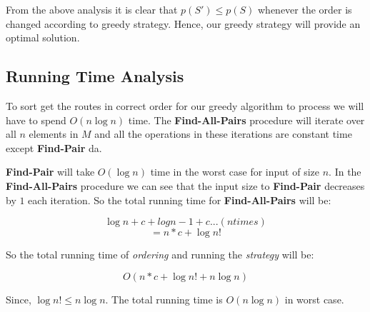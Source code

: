 \documentclass[8pt]{article}
\begin{document}
From the above analysis it is clear that $p(S') \leq p(S)$ whenever the order is changed according to greedy strategy. Hence, our greedy strategy will provide an optimal solution.

\subsection{Running Time Analysis}
To sort get the routes in correct order for our greedy algorithm to process we will have to spend $O(n\log{n})$ time. The \textbf{Find-All-Pairs} procedure will iterate over all $n$ elements in $M$ and all the operations in these iterations are constant time except \textbf{Find-Pair} da.

\textbf{Find-Pair} will take $O(\log{n})$ time in the worst case for input of size $n$. In the \textbf{Find-All-Pairs} procedure we can see that the input size to \textbf{Find-Pair} decreases by $1$ each iteration. So the total running time for \textbf{Find-All-Pairs} will be:

$$\log{n} + c + log{n - 1} + c ...(n times)$$
$$= n*c + \log{n!}$$

So the total running time of \textit{ordering} and running the \textit{strategy} will be:

$$O(n*c + \log{n!} + n\log{n})$$

Since, $\log{n!} \leq n\log{n}$. The total running time is $O(n\log{n})$ in worst case.
\end{document}
